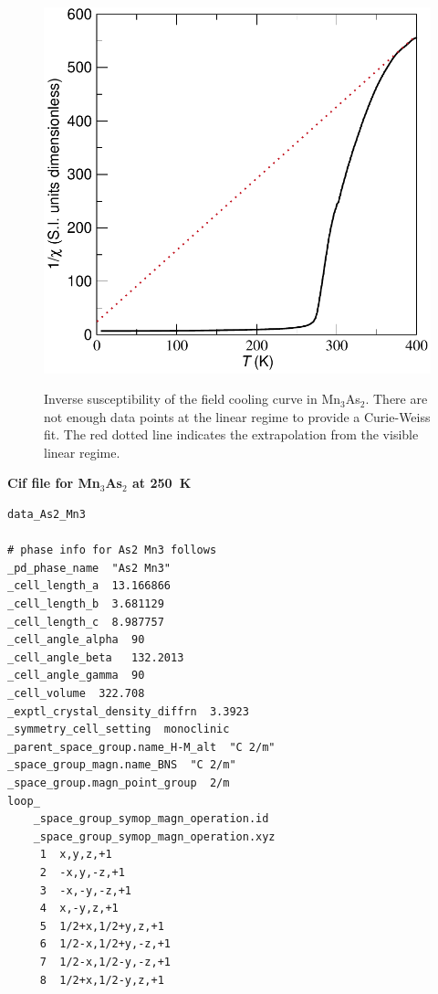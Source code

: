 \documentclass[10pt,doublespacing,edeposit]{uiucthesis2020}
\begin{document}
\begin{mainmatter}
\begin{figure}
\centering\includegraphics[width=0.6\columnwidth]{figures/ch6/FC_52A_inverse_cropped.pdf} \\
\caption{\label{fig:inverse_susceptibility}
Inverse susceptibility of the field cooling curve in Mn$_3$As$_2$. There are not enough data points at the linear regime to provide a Curie-Weiss fit. The red dotted line indicates the extrapolation from the visible linear regime.
} 
\end{figure}





\FloatBarrier

\vspace{1em}
\begin{center}
\textbf{Cif file for Mn$_3$As$_2$ at 250~K}\\
\end{center}
\normalsize

\begin{verbatim}
data_As2_Mn3

# phase info for As2 Mn3 follows
_pd_phase_name  "As2 Mn3"
_cell_length_a  13.166866
_cell_length_b  3.681129
_cell_length_c  8.987757
_cell_angle_alpha  90
_cell_angle_beta   132.2013
_cell_angle_gamma  90
_cell_volume  322.708
_exptl_crystal_density_diffrn  3.3923
_symmetry_cell_setting  monoclinic
_parent_space_group.name_H-M_alt  "C 2/m"
_space_group_magn.name_BNS  "C 2/m"
_space_group.magn_point_group  2/m
loop_
    _space_group_symop_magn_operation.id
    _space_group_symop_magn_operation.xyz
     1  x,y,z,+1
     2  -x,y,-z,+1
     3  -x,-y,-z,+1
     4  x,-y,z,+1
     5  1/2+x,1/2+y,z,+1
     6  1/2-x,1/2+y,-z,+1
     7  1/2-x,1/2-y,-z,+1
     8  1/2+x,1/2-y,z,+1


\end{verbatim}
\end{mainmatter}
\end{document}
